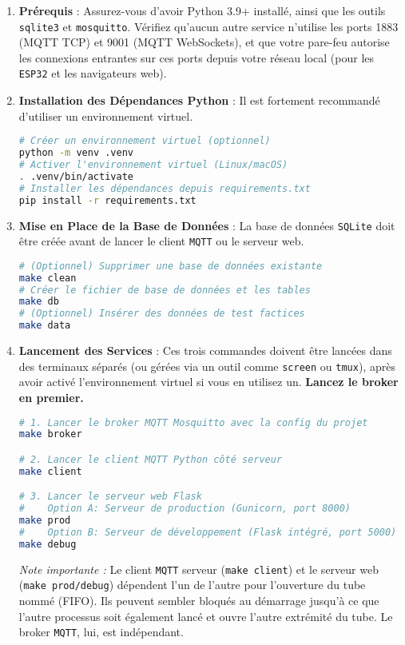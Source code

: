 \documentclass[12pt]{article}
\begin{document}
\begin{enumerate}
    \item \textbf{Prérequis} : Assurez-vous d'avoir Python 3.9+ installé, ainsi que les outils \texttt{sqlite3} et \texttt{mosquitto}. Vérifiez qu'aucun autre service n'utilise les ports 1883 (MQTT TCP) et 9001 (MQTT WebSockets), et que votre pare-feu autorise les connexions entrantes sur ces ports depuis votre réseau local (pour les \texttt{ESP32} et les navigateurs web).

    \item \textbf{Installation des Dépendances Python} : Il est fortement recommandé d'utiliser un environnement virtuel.
        \begin{lstlisting}[language=bash]
# Créer un environnement virtuel (optionnel)
python -m venv .venv
# Activer l'environnement virtuel (Linux/macOS)
. .venv/bin/activate
# Installer les dépendances depuis requirements.txt
pip install -r requirements.txt
        \end{lstlisting}

    \item \textbf{Mise en Place de la Base de Données} : La base de données \texttt{SQLite} doit être créée avant de lancer le client \texttt{MQTT} ou le serveur web.
        \begin{lstlisting}[language=bash]
# (Optionnel) Supprimer une base de données existante
make clean
# Créer le fichier de base de données et les tables
make db
# (Optionnel) Insérer des données de test factices
make data
        \end{lstlisting}

    \item \textbf{Lancement des Services} : Ces trois commandes doivent être lancées dans des terminaux séparés (ou gérées via un outil comme \texttt{screen} ou \texttt{tmux}), après avoir activé l'environnement virtuel si vous en utilisez un. \textbf{Lancez le broker en premier.}
        \begin{lstlisting}[language=bash]
# 1. Lancer le broker MQTT Mosquitto avec la config du projet
make broker

# 2. Lancer le client MQTT Python côté serveur
make client

# 3. Lancer le serveur web Flask
#    Option A: Serveur de production (Gunicorn, port 8000)
make prod
#    Option B: Serveur de développement (Flask intégré, port 5000)
make debug
        \end{lstlisting}
        \textit{Note importante :} Le client \texttt{MQTT} serveur (\texttt{make client}) et le serveur web (\texttt{make prod/debug}) dépendent l'un de l'autre pour l'ouverture du tube nommé (FIFO). Ils peuvent sembler bloqués au démarrage jusqu'à ce que l'autre processus soit également lancé et ouvre l'autre extrémité du tube. Le broker \texttt{MQTT}, lui, est indépendant.
\end{enumerate}
\end{document}
